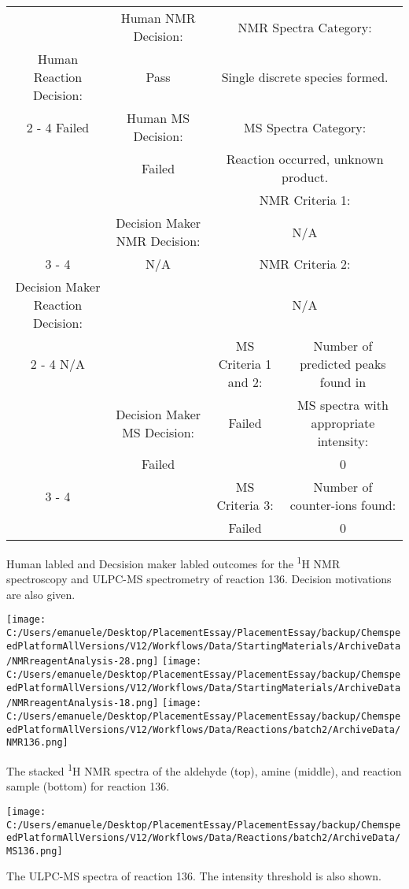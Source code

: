 \documentclass{article}%
\begin{document}
\begin{Decision Table}[H]%
\begin{tabular}{|c|c|c|c|}%
\hline%
&Human NMR Decision:&\multicolumn{2}{|c|}{NMR Spectra Category:}\\%
Human Reaction Decision:&Pass&\multicolumn{2}{|c|}{Single discrete species formed.}\\%
\cline{2%
-%
4}%
Failed&Human MS Decision:&\multicolumn{2}{|c|}{MS Spectra Category:}\\%
&Failed&\multicolumn{2}{|c|}{Reaction occurred, unknown product.}\\%
\hline%
&&\multicolumn{2}{|c|}{NMR Criteria 1:}\\%
&Decision Maker NMR Decision:&\multicolumn{2}{|c|}{N/A}\\%
\cline{3%
-%
4}%
&N/A&\multicolumn{2}{|c|}{NMR Criteria 2:}\\%
Decision Maker Reaction Decision:&&\multicolumn{2}{|c|}{N/A}\\%
\cline{2%
-%
4}%
N/A&&MS Criteria 1 and 2:&Number of predicted peaks found in\\%
&Decision Maker MS Decision:&Failed&MS spectra with appropriate intensity:\\%
&Failed&&0\\%
\cline{3%
-%
4}%
&&MS Criteria 3:&Number of counter{-}ions found:\\%
&&Failed&0\\%
\hline%
\end{tabular}%
\caption{Human labled and Decsision maker labled outcomes for the \textsuperscript{1}H NMR spectroscopy and ULPC-MS spectrometry of reaction 136. Decision motivations are also given.}%
\end{Decision Table}%
\begin{NMR Spectra}[H]%
\begin{center}%
\texttt{[image: C:/Users/emanuele/Desktop/PlacementEssay/PlacementEssay/backup/ChemspeedPlatformAllVersions/V12/Workflows/Data/StartingMaterials/ArchiveData/NMRreagentAnalysis-28.png]}\hfill%
\texttt{[image: C:/Users/emanuele/Desktop/PlacementEssay/PlacementEssay/backup/ChemspeedPlatformAllVersions/V12/Workflows/Data/StartingMaterials/ArchiveData/NMRreagentAnalysis-18.png]}\hfill%
\texttt{[image: C:/Users/emanuele/Desktop/PlacementEssay/PlacementEssay/backup/ChemspeedPlatformAllVersions/V12/Workflows/Data/Reactions/batch2/ArchiveData/NMR136.png]}\hfill%
\end{center}%
\caption{The stacked \textsuperscript{1}H NMR spectra of the aldehyde (top), amine (middle), and reaction sample (bottom) for reaction 136.}%
\end{NMR Spectra}%
\begin{MS Spectra}[H]%
\begin{center}%
\texttt{[image: C:/Users/emanuele/Desktop/PlacementEssay/PlacementEssay/backup/ChemspeedPlatformAllVersions/V12/Workflows/Data/Reactions/batch2/ArchiveData/MS136.png]}\hfill%
\end{center}%
\caption{The ULPC-MS spectra of reaction 136. The intensity threshold is also shown.}%
\end{MS Spectra}%
\end{document}
